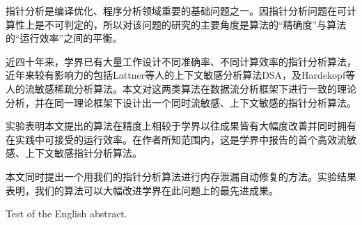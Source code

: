 
\begin{cabstract}
指针分析是编译优化、程序分析领域重要的基础问题之一。因指针分析问题在可计算性上是不可判定的，所以对该问题的研究的主要角度是算法的“精确度”与算法的“运行效率”之间的平衡。

近四十年来，学界已有大量工作设计不同准确率、不同计算效率的指针分析算法，近年来较有影响力的包括Lattner等人的上下文敏感分析算法DSA\supercite{Lattner2007}，及Hardekopf等人的流敏感稀疏分析算法\supercite{hardekopf2011flow}。本文对这两类算法在数据流分析框架下进行一致的理论分析，并在同一理论框架下设计出一个同时流敏感、上下文敏感的指针分析算法。

实验表明本文提出的算法在精度上相较于学界以往成果皆有大幅度改善并同时拥有在实践中可接受的运行效率。在作者所知范围内，这是学界中报告的首个高效流敏感、上下文敏感指针分析算法。

本文同时提出一个用我们的指针分析算法进行内存泄漏自动修复的方法。实验结果表明，我们的算法可以大幅改进学界在此问题上的最先进成果。
\end{cabstract}

\begin{eabstract}
	Test of the English abstract.
\end{eabstract}

